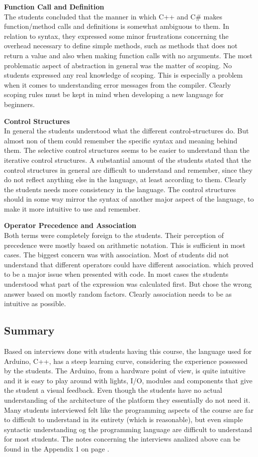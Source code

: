 \textbf{Function Call and Definition}\\
The students concluded that the manner in which C++ and C{\#} makes function/method calls and definitions is somewhat ambiguous to them. In relation to syntax, they expressed some minor frustrations concerning the overhead necessary to define simple methods, such as methods that does not return a value and also when making function calls with no arguments. The most problematic aspect of abstraction in general was the matter of scoping. No students expressed any real knowledge of scoping. This is especially a problem when it comes to understanding error messages from the compiler. Clearly scoping rules must be kept in mind when developing a new language for beginners.

\textbf{Control Structures}\\
In general the students understood what the different control-structures do. But almost non of them could remember the specific syntax and meaning behind them. The selective control structures seems to be easier to understand than the iterative control structures. A substantial amount of the students stated that the control structures in general are difficult to understand and remember, since they do not reflect anything else in the language, at least according to them.
Clearly the students needs more consistency in the language. The control structures should in some way mirror the syntax of another major aspect of the language, to make it more intuitive to use and remember.

\textbf{Operator Precedence and Association}\\
Both terms were completely foreign to the students. Their perception of precedence were mostly based on arithmetic notation. This is sufficient in most cases. The biggest concern was with association. Most of students did not understand that different operators could have different association. which proved to be a major issue when presented with code. In most cases the students understood what part of the expression was calculated first. But chose the wrong answer based on mostly random factors. Clearly association needs to be as intuitive as possible.

\subsection{Summary}
Based on interviews done with students having this course, the language used for Arduino, C++, has a steep learning curve, considering the experience possessed by the students. The Arduino, from a hardware point of view, is quite intuitive and it is easy to play around with lights, I/O, modules and components that give the student a visual feedback. Even though the students have no actual understanding of the architecture of the platform they essentially do not need it. Many students interviewed felt like the programming aspects of the course are far to difficult to understand in its entirety (which is reasonable), but even simple syntactic understanding og the programming language are difficult to understand for most students. The notes concerning the interviews analized above can be found in the Appendix 1 on page \pageref{Interviews}.


